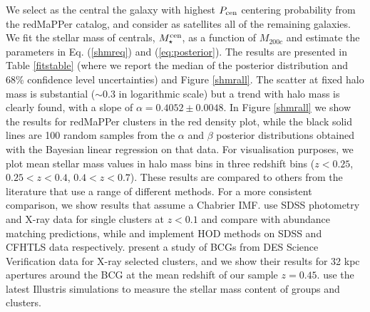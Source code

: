 {We select as the central the galaxy with highest $P_{\rm cen}$ centering probability from the redMaPPer catalog, and consider as satellites all of the remaining galaxies. We fit the stellar mass of centrals, $M_\star^{\rm cen}$, as a function of $M_{200c}$ and estimate the parameters in Eq. (\ref{shmreq}) and (\ref{eq:posterior}). The results are presented in Table \ref{fitstable} (where we report the median of the posterior distribution and 68\% confidence level uncertainties) and Figure \ref{shmrall}. The scatter at fixed halo mass is substantial ($\sim 0.3$ in logarithmic scale) but a trend with halo mass is clearly found, with a slope of $\alpha=0.4052\pm 0.0048$. 
In Figure \ref{shmrall} we show the results for redMaPPer clusters in the red density plot, while the black solid lines are 100 random samples from the $\alpha$ and $\beta$ posterior distributions obtained with the Bayesian linear regression on that data. For visualisation purposes, we plot mean stellar mass values in halo mass bins in three redshift bins ($z<0.25$, $0.25<z<0.4$, $0.4<z<0.7$). These results are compared to others from the literature that use a range of different methods. For a more consistent comparison, we show results that assume a Chabrier IMF. \citet{kravtsov} use SDSS photometry and X-ray data for single clusters at $z<0.1$ and compare with abundance matching predictions, while \citet{zu} and \citet{coupon} implement HOD methods on SDSS and CFHTLS data respectively. \citet{zhangbcg} present a study of BCGs from DES Science Verification data for X-ray selected clusters, and we show their results for 32 kpc apertures around the BCG at the mean redshift of our sample $z=0.45$. \citet{illustris} use the latest Illustris simulations to measure the stellar mass content of groups and clusters.

}
